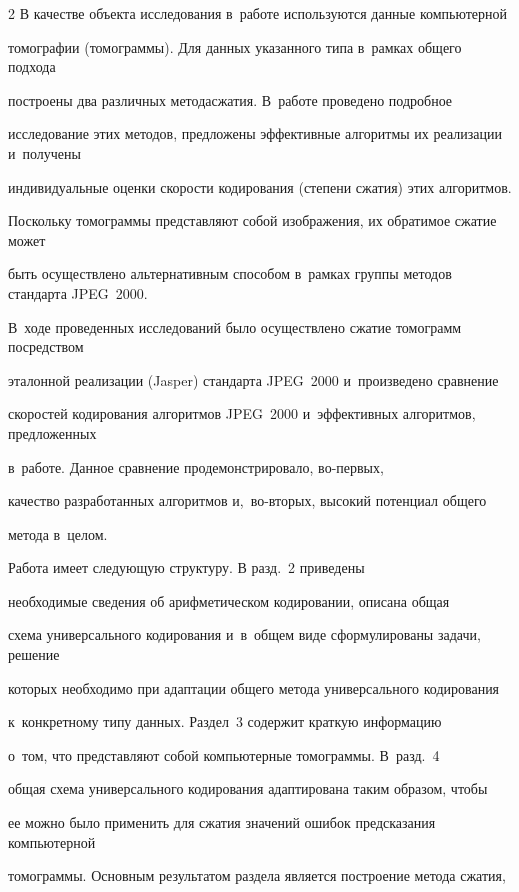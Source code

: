 \begin{multicols}{2}
В качестве объекта исследования в~работе используются данные компьютерной 

томографии (томограммы). Для данных указанного типа в~рамках общего подхода 

построены два различных метода\linebreak сжатия. В~работе проведено подробное 

исследова\-ние этих методов, предложены эффективные алго\-ритмы их реализации и~получены 

индивидуальные оценки скорости кодирования (степени сжатия) этих алгоритмов.



Поскольку томограммы представляют собой изображения, их обратимое сжатие может 

быть осуществлено альтернативным способом в~рамках группы методов стандарта JPEG~2000. 

В~ходе проведенных исследований было осуществлено сжатие томограмм посредством 

эталонной реализации (Jasper) стандарта JPEG~2000 и~произведено сравнение 

скоростей кодирования алгоритмов JPEG~2000 и~эффективных алгоритмов, предложенных 

в~работе. Данное сравнение продемонстрировало, во-пер\-вых, 

качество разработанных алгоритмов и,~во-вто\-рых, высокий потенциал общего 

метода в~целом.



Работа имеет следующую структуру. В разд.~2 приведены 

необходимые сведения об арифметическом кодировании, описана общая 

схема универсального кодирования и~в~общем виде сформулированы задачи, решение 

которых необходимо при адаптации общего метода универсального кодирования 

к~конкретному типу данных. Раздел~3 содержит краткую информацию 

о~том, что пред\-став\-ля\-ют собой компьютерные томограммы. В~разд.~4 

общая схема универсального кодирования адаптирована таким образом, чтобы 

ее можно было применить для сжатия значений ошибок предсказания компьютерной 

томограммы. Основным результатом раздела является построение метода сжатия, 


\end{multicols}
